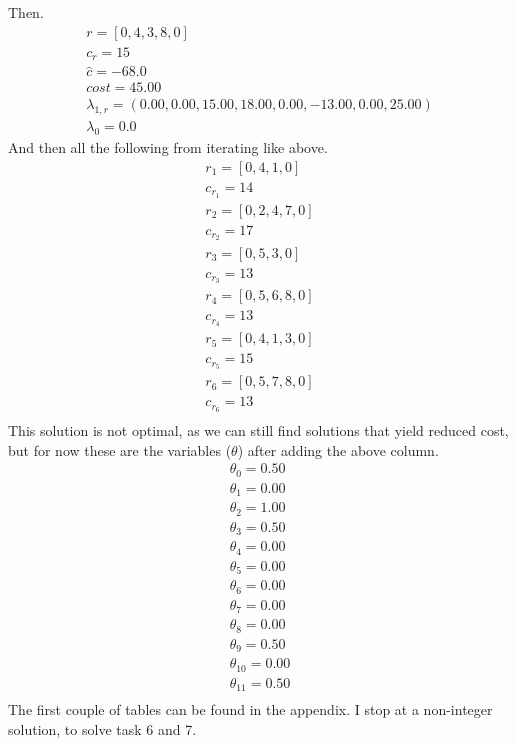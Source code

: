 \documentclass{article}
\begin{document}
    Then.
    \begin{equation*}
        \begin{array}{c}
            r = [0, 4, 3, 8, 0]\\
            c_r = 15\\
            \hat{c} = -68.0\\
            cost = 45.00\\
            \lambda_{1,r} = (0.00,0.00,15.00,18.00,0.00,-13.00,0.00,25.00)\\
            \lambda_0 = 0.0
        \end{array}
    \end{equation*}
    And then all the following from iterating like above.
    \begin{equation*}
        \begin{array}{c}
            r_1 = [0, 4, 1, 0]\\
            c_{r_1} = 14\\
            r_2 = [0, 2, 4, 7, 0]\\
            c_{r_2} = 17\\
            r_3 = [0, 5, 3, 0]\\
            c_{r_3} = 13\\
            r_4 = [0, 5, 6, 8, 0]\\
            c_{r_4} = 13\\
            r_5 = [0, 4, 1, 3, 0]\\
            c_{r_5} = 15\\
            r_6 = [0, 5, 7, 8, 0]\\
            c_{r_6} = 13\\
        \end{array}
    \end{equation*}
    This solution is not optimal, as we can still find solutions that yield reduced cost, but for now these are the variables ($\theta$) after adding the above column.
    \begin{equation*}
        \begin{array}{c}
            \theta_{0} = 0.50\\
            \theta_{1} = 0.00\\
            \theta_{2} = 1.00\\
            \theta_{3} = 0.50\\
            \theta_{4} = 0.00\\
            \theta_{5} = 0.00\\
            \theta_{6} = 0.00\\
            \theta_{7} = 0.00\\
            \theta_{8} = 0.00\\
            \theta_{9} = 0.50\\
            \theta_{10} = 0.00\\
            \theta_{11} = 0.50\\
        \end{array}
    \end{equation*}
    The first couple of tables can be found in the appendix.
    I stop at a non-integer solution, to solve task 6 and 7.
\end{document}
